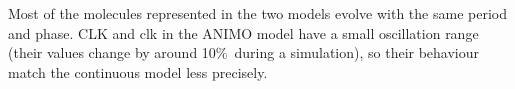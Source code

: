 \documentclass{bmcart}
\begin{document}
Most of the molecules represented in the two models evolve with the same period and phase.
CLK and clk in the ANIMO model have
a small oscillation range (their values change by around 10\%\ during a simulation),
so their behaviour match the continuous model less precisely.
%
%
%
\end{document}
